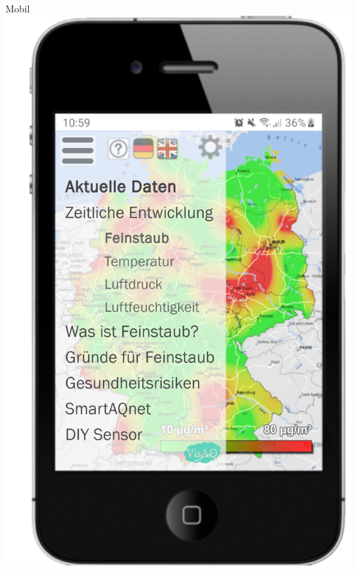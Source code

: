 \begin{frame}{Mobil}
    \centering
    \includegraphics[height=0.8\textheight]{../../media/Menue-Mobile-Version}
\end{frame}
